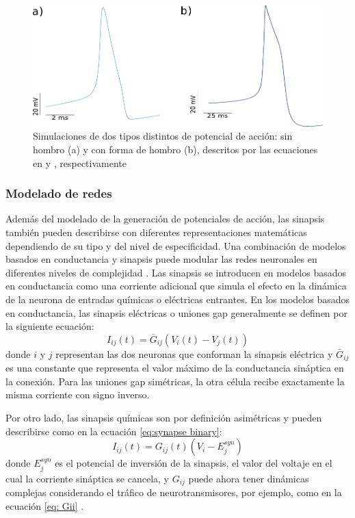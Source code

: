 \begin{figure}[htb!]
	\includegraphics[width=\textwidth]{img/intro/spike-types model.pdf}
	\caption{Simulaciones de dos tipos distintos de potencial de acción: sin hombro (a) y con forma de hombro (b), descritos por las ecuaciones en \textcite{hodgkin_quantitative_1952} y \textcite{vavoulis_balanced_2010}, respectivamente}
	\label{fig:spike-types model spanish}
\end{figure}

\subsubsection{\large{Modelado de redes}}
\label{c-intro-synapses}
Además del modelado de la generación de potenciales de acción, las sinapsis también pueden describirse con diferentes representaciones matemáticas dependiendo de su tipo y del nivel de especificidad. Una combinación de modelos basados en conductancia y sinapsis puede modular las redes neuronales en diferentes niveles de complejidad \parencite{aguirre_pattern_2007,latorre_transient_2013,huerta_topology_2001}. Las sinapsis se introducen en modelos basados en conductancia como una corriente adicional que simula el efecto en la dinámica de la neurona de entradas químicas o eléctricas entrantes. En los modelos basados en conductancia, las sinapsis eléctricas o uniones gap generalmente se definen por la siguiente ecuación:
\begin{equation}
    I_{ij}(t) = \bar{G}_{ij} (V_i(t) - V_j(t))
\end{equation}
\noindent donde $i$ y $j$ representan las dos neuronas que conforman la sinapsis eléctrica y $\bar{G}_{ij}$ es una constante que representa el valor máximo de la conductancia sináptica en la conexión. Para las uniones gap simétricas, la otra célula recibe exactamente la misma corriente con signo inverso.

Por otro lado, las sinapsis químicas son por definición asimétricas y pueden describirse como en la ecuación \ref{eq:synapse binary}:
\begin{equation}
     I_{ij}(t) = G_{ij}(t) (V_i - E_j^{syn})
     \label{eq:synapse binary spanish}
\end{equation}
\noindent donde $E_j^{syn}$ es el potencial de inversión de la sinapsis, el valor del voltaje en el cual la corriente sináptica se cancela, y $G_{ij}$ puede ahora tener dinámicas complejas considerando el tráfico de neurotransmisores, por ejemplo, como en la ecuación \ref{eq: Gii} \parencite{torres_modeling_2012}. 


